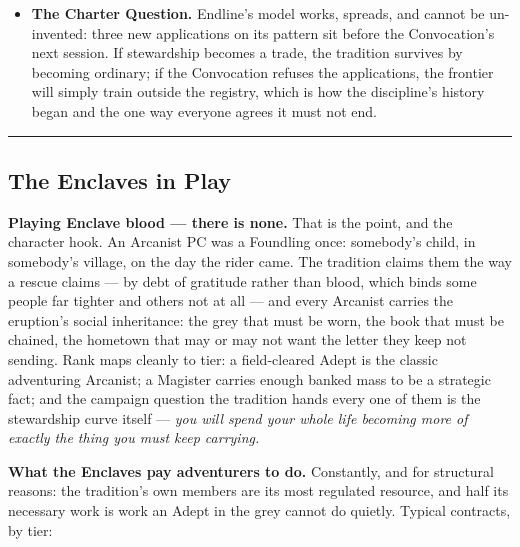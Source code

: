 \begin{itemize}
    \item \textbf{The Charter Question.} Endline's model works, spreads, and cannot be un-invented: three new applications on its pattern sit before the Convocation's next session. If stewardship becomes a trade, the tradition survives by becoming ordinary; if the Convocation refuses the applications, the frontier will simply train outside the registry, which is how the discipline's history began and the one way everyone agrees it must not end.
\end{itemize}

\medskip\hrule\medskip

\subsection{The Enclaves in Play}

\textbf{Playing Enclave blood --- there is none.} That is the point, and the character hook. An Arcanist PC was a Foundling once: somebody's child, in somebody's village, on the day the rider came. The tradition claims them the way a rescue claims --- by debt of gratitude rather than blood, which binds some people far tighter and others not at all --- and every Arcanist carries the eruption's social inheritance: the grey that must be worn, the book that must be chained, the hometown that may or may not want the letter they keep not sending. Rank maps cleanly to tier: a field-cleared Adept is the classic adventuring Arcanist; a Magister carries enough banked mass to be a strategic fact; and the campaign question the tradition hands every one of them is the stewardship curve itself --- \textit{you will spend your whole life becoming more of exactly the thing you must keep carrying.}

\textbf{What the Enclaves pay adventurers to do.} Constantly, and for structural reasons: the tradition's own members are its most regulated resource, and half its necessary work is work an Adept in the grey cannot do quietly. Typical contracts, by tier:

